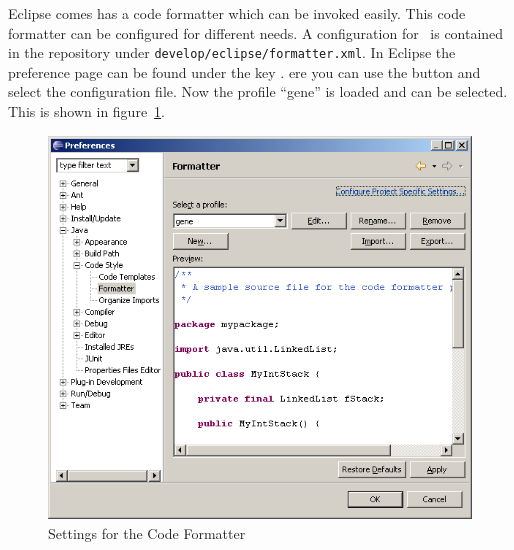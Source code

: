 Eclipse comes has a code formatter which can be invoked easily. This
code formatter can be configured for different needs. A configuration
for \ExTeX\ is contained in the repository under
\texttt{develop/eclipse/formatter.xml}. In Eclipse the preference page
can be found under the key .
ere you can use the button  and select the
configuration file. Now the profile ``gene'' is loaded and can be
selected. This is shown in figure~\ref{fig:eclipse-formatter-gene}.
\begin{figure}[htp]
  \centering  \includegraphics[scale=.4]{image/eclipse/formatter-gene}
  \caption{Settings for the Code Formatter}\label{fig:eclipse-formatter-gene}
\end{figure}

